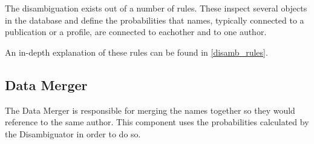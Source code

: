 The disambiguation exists out of a number of rules. These inspect several objects in the database and define the probabilities that names, typically connected to a publication or a profile, are connected to eachother and to one author. %

An in-depth explanation of these rules can be found in \ref{disamb_rules}.

\subsection{Data Merger}

The Data Merger is responsible for merging the names together so they would reference to the same author. This component uses the probabilities calculated by the Disambiguator in order to do so.

%
%
%
%
%
%
%
%
%
%
%

